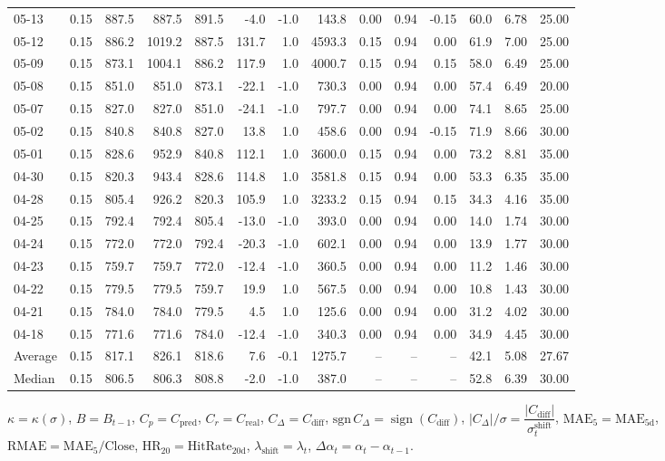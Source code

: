 \begin{threeparttable}
{\begin{tabular}{lrrrrrrrrrrrrr}
05-13 & 0.15 & 887.5 & 887.5 & 891.5 & -4.0 & -1.0 & 143.8 & 0.00 & 0.94 & -0.15 & 60.0 & 6.78 & 25.00 \\
05-12 & 0.15 & 886.2 & 1019.2 & 887.5 & 131.7 & 1.0 & 4593.3 & 0.15 & 0.94 & 0.00 & 61.9 & 7.00 & 25.00 \\
05-09 & 0.15 & 873.1 & 1004.1 & 886.2 & 117.9 & 1.0 & 4000.7 & 0.15 & 0.94 & 0.15 & 58.0 & 6.49 & 25.00 \\
05-08 & 0.15 & 851.0 & 851.0 & 873.1 & -22.1 & -1.0 & 730.3 & 0.00 & 0.94 & 0.00 & 57.4 & 6.49 & 20.00 \\
05-07 & 0.15 & 827.0 & 827.0 & 851.0 & -24.1 & -1.0 & 797.7 & 0.00 & 0.94 & 0.00 & 74.1 & 8.65 & 25.00 \\
05-02 & 0.15 & 840.8 & 840.8 & 827.0 & 13.8 & 1.0 & 458.6 & 0.00 & 0.94 & -0.15 & 71.9 & 8.66 & 30.00 \\
05-01 & 0.15 & 828.6 & 952.9 & 840.8 & 112.1 & 1.0 & 3600.0 & 0.15 & 0.94 & 0.00 & 73.2 & 8.81 & 35.00 \\
04-30 & 0.15 & 820.3 & 943.4 & 828.6 & 114.8 & 1.0 & 3581.8 & 0.15 & 0.94 & 0.00 & 53.3 & 6.35 & 35.00 \\
04-28 & 0.15 & 805.4 & 926.2 & 820.3 & 105.9 & 1.0 & 3233.2 & 0.15 & 0.94 & 0.15 & 34.3 & 4.16 & 35.00 \\
04-25 & 0.15 & 792.4 & 792.4 & 805.4 & -13.0 & -1.0 & 393.0 & 0.00 & 0.94 & 0.00 & 14.0 & 1.74 & 30.00 \\
04-24 & 0.15 & 772.0 & 772.0 & 792.4 & -20.3 & -1.0 & 602.1 & 0.00 & 0.94 & 0.00 & 13.9 & 1.77 & 30.00 \\
04-23 & 0.15 & 759.7 & 759.7 & 772.0 & -12.4 & -1.0 & 360.5 & 0.00 & 0.94 & 0.00 & 11.2 & 1.46 & 30.00 \\
04-22 & 0.15 & 779.5 & 779.5 & 759.7 & 19.9 & 1.0 & 567.5 & 0.00 & 0.94 & 0.00 & 10.8 & 1.43 & 30.00 \\
04-21 & 0.15 & 784.0 & 784.0 & 779.5 & 4.5 & 1.0 & 125.6 & 0.00 & 0.94 & 0.00 & 31.2 & 4.02 & 30.00 \\
04-18 & 0.15 & 771.6 & 771.6 & 784.0 & -12.4 & -1.0 & 340.3 & 0.00 & 0.94 & 0.00 & 34.9 & 4.45 & 30.00 \\
Average & 0.15 & 817.1 & 826.1 & 818.6 & 7.6 & -0.1 & 1275.7 & -- & -- & -- & 42.1 & 5.08 & 27.67 \\
Median & 0.15 & 806.5 & 806.3 & 808.8 & -2.0 & -1.0 & 387.0 & -- & -- & -- & 52.8 & 6.39 & 30.00 \\
\bottomrule
\end{tabular}
}%
\begin{tablenotes}\footnotesize
\item $\kappa=\kappa(\sigma)$, $B=B_{t-1}$, $C_p=C_{\text{pred}}$, $C_r=C_{\text{real}}$, $C_\Delta=C_{\text{diff}}$, $\mathrm{sgn}\,C_\Delta=\operatorname{sign}(C_{\text{diff}})$, $|C_\Delta|/\sigma=\dfrac{|C_{\text{diff}}|}{\sigma_t^{\text{shift}}}$, $\mathrm{MAE}_5=\mathrm{MAE}_{5\text{d}}$, $\mathrm{RMAE}= \mathrm{MAE}_5 / \text{Close}$, $\mathrm{HR}_{20}=\mathrm{HitRate}_{20\text{d}}$, 
$\lambda_{\text{shift}}=\lambda_t$, 
$\Delta\alpha_t=\alpha_t-\alpha_{t-1}$.
\end{tablenotes}
\end{threeparttable}
\endgroup
